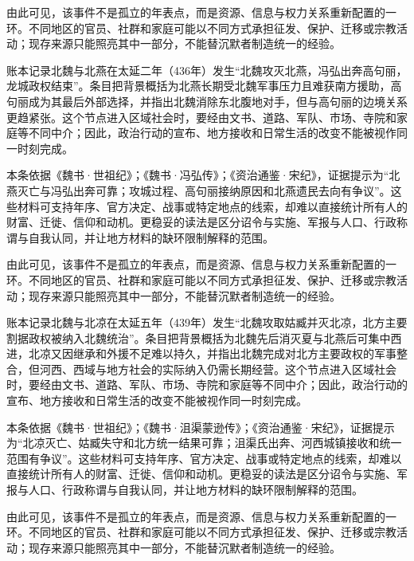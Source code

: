 由此可见，该事件不是孤立的年表点，而是资源、信息与权力关系重新配置的一环。不同地区的官员、社群和家庭可能以不同方式承担征发、保护、迁移或宗教活动；现存来源只能照亮其中一部分，不能替沉默者制造统一的经验。

账本记录北魏与北燕在太延二年（436年）发生“北魏攻灭北燕，冯弘出奔高句丽，龙城政权结束”。条目把背景概括为北燕长期受北魏军事压力且难获南方援助，高句丽成为其最后外部选择，并指出北魏消除东北腹地对手，但与高句丽的边境关系更趋紧张。这个节点进入区域社会时，要经由文书、道路、军队、市场、寺院和家庭等不同中介；因此，政治行动的宣布、地方接收和日常生活的改变不能被视作同一时刻完成。

本条依据《魏书·世祖纪》；《魏书·冯弘传》；《资治通鉴·宋纪》，证据提示为“北燕灭亡与冯弘出奔可靠；攻城过程、高句丽接纳原因和北燕遗民去向有争议”。这些材料可支持年序、官方决定、战事或特定地点的线索，却难以直接统计所有人的财富、迁徙、信仰和动机。更稳妥的读法是区分诏令与实施、军报与人口、行政称谓与自我认同，并让地方材料的缺环限制解释的范围。

由此可见，该事件不是孤立的年表点，而是资源、信息与权力关系重新配置的一环。不同地区的官员、社群和家庭可能以不同方式承担征发、保护、迁移或宗教活动；现存来源只能照亮其中一部分，不能替沉默者制造统一的经验。

账本记录北魏与北凉在太延五年（439年）发生“北魏攻取姑臧并灭北凉，北方主要割据政权被纳入北魏统治”。条目把背景概括为北魏先后消灭夏与北燕后可集中西进，北凉又因继承和外援不足难以持久，并指出北魏完成对北方主要政权的军事整合，但河西、西域与地方社会的实际纳入仍需长期经营。这个节点进入区域社会时，要经由文书、道路、军队、市场、寺院和家庭等不同中介；因此，政治行动的宣布、地方接收和日常生活的改变不能被视作同一时刻完成。

本条依据《魏书·世祖纪》；《魏书·沮渠蒙逊传》；《资治通鉴·宋纪》，证据提示为“北凉灭亡、姑臧失守和北方统一结果可靠；沮渠氏出奔、河西城镇接收和统一范围有争议”。这些材料可支持年序、官方决定、战事或特定地点的线索，却难以直接统计所有人的财富、迁徙、信仰和动机。更稳妥的读法是区分诏令与实施、军报与人口、行政称谓与自我认同，并让地方材料的缺环限制解释的范围。

由此可见，该事件不是孤立的年表点，而是资源、信息与权力关系重新配置的一环。不同地区的官员、社群和家庭可能以不同方式承担征发、保护、迁移或宗教活动；现存来源只能照亮其中一部分，不能替沉默者制造统一的经验。

